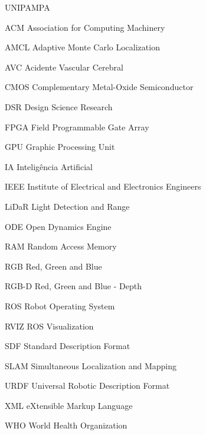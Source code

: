 \documentclass[tcc,baec,oneside]{unipampa}
\begin{document}
%
\begin{listofabbrv}{UNIPAMPA}
        \item[ACM] Association for Computing Machinery
       \item[AMCL]  Adaptive Monte Carlo Localization
        \item[AVC]     Acidente Vascular Cerebral
        \item[CMOS]    Complementary Metal-Oxide Semiconductor
        \item[DSR]      Design Science Research
        \item[FPGA]    Field Programmable Gate Array
        \item[GPU]     Graphic Processing Unit
        \item[IA]      Inteligência Artificial
        \item[IEEE] Institute of Electrical and Electronics Engineers 
        \item[LiDaR]   Light Detection and Range
        \item[ODE]     Open Dynamics Engine
        \item[RAM]      Random Access Memory
        \item[RGB]   Red, Green and Blue
        \item[RGB-D]   Red, Green and Blue - Depth
        \item[ROS]     Robot Operating System
        \item[RVIZ] ROS Visualization
        \item[SDF]      Standard Description Format
        \item[SLAM]    Simultaneous Localization and Mapping
        \item[URDF]    Universal Robotic Description Format
        \item[XML]      eXtensible Markup Language 
        \item[WHO]     World Health Organization
\end{listofabbrv}


% 
%
\end{document}
